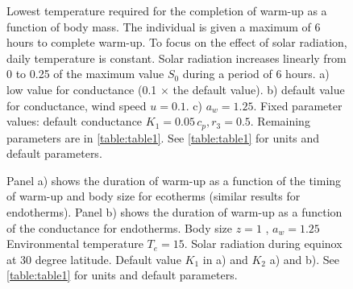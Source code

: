 \begin{figure}[H]
\begin{center}
\caption{
	Lowest temperature required for the completion of warm-up as a function of body mass.
	The individual is given a maximum of 6 hours to complete warm-up.
	To focus on the effect of solar radiation, daily temperature is constant.
	Solar radiation increases linearly from 0 to 0.25 of the maximum value $S_0$ during a period of 6 hours.
	a)  low value for conductance (0.1 $\times$ the default value).
	b) default value for conductance, wind speed  $u = 0.1$.
	c)  $a_w = 1.25$.
	Fixed parameter values: default conductance $K_1 = 0.05 \, c_p, r_3 = 0.5$.
	Remaining parameters are in \cref{table:table1}.
	See \cref{table:table1} for units and default parameters.
}
\label{fig3}
\end{center}
\end{figure}
%
\begin{figure}[H]
\begin{center}
\caption{
	Panel a) shows the duration of warm-up as a function of the timing of warm-up and body size for ecotherms (similar results for endotherms).
	Panel b) shows the duration of warm-up as a function of the conductance for endotherms. Body size $z = 1$ , $a_w = 1.25$
	Environmental temperature $ T_e = 15$.
	Solar radiation during equinox at 30 degree latitude.
	Default value $K_1$ in a) and $K_2$ a) and b).
	See \cref{table:table1} for units and default parameters.
}
\label{fig4}
\end{center}
\end{figure}
